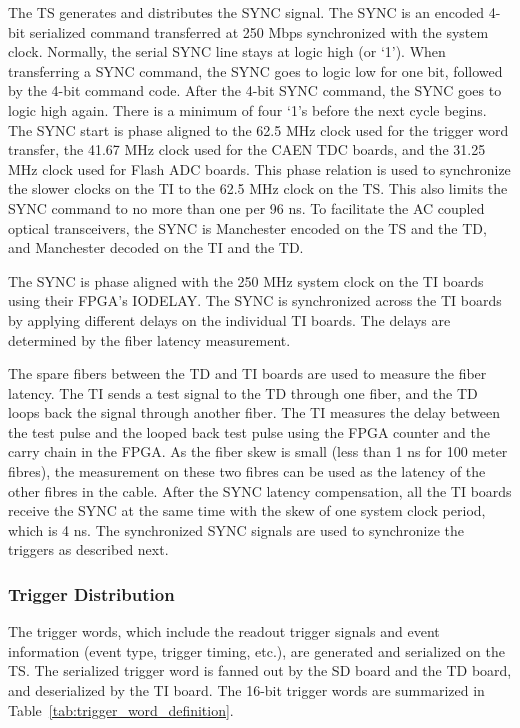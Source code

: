 The TS generates and distributes the SYNC signal.  The SYNC is an encoded 4-bit serialized command transferred at 250 Mbps synchronized with the system clock.  Normally, the serial SYNC line stays at logic high (or ‘1’).  When transferring a SYNC command, the SYNC goes to logic low for one bit, followed by the 4-bit command code.  After the 4-bit SYNC command, the SYNC goes to logic high again.  There is a minimum of four ‘1’s before the next cycle begins.  The SYNC start is phase aligned to the 62.5 MHz clock used for the trigger word transfer, the 41.67 MHz clock used for the CAEN TDC boards, and the 31.25 MHz clock used for Flash ADC boards.  This phase relation is used to synchronize the slower clocks on the TI to the 62.5 MHz clock on the TS.  This also limits the SYNC command to no more than one per 96 ns.  To facilitate the AC coupled optical transceivers, the SYNC is Manchester encoded on the TS and the TD, and Manchester decoded on the TI and the TD.

The SYNC is phase aligned with the 250 MHz system clock on the TI boards using their FPGA’s IODELAY.  The SYNC is synchronized across the TI boards by applying different delays on the individual TI boards.  The delays are determined by the fiber latency measurement.  

The spare fibers between the TD and TI boards are used to measure the fiber latency.  The TI sends a test signal to the TD through one fiber, and the TD loops back the signal through another fiber.  The TI measures the delay between the test pulse and the looped back test pulse using the FPGA counter and the carry chain in the FPGA.  As the fiber skew is small (less than 1 ns for 100 meter fibres), the measurement on these two fibres can be used as the latency of the other fibres in the cable.  
After the SYNC latency compensation, all the TI boards receive the SYNC at the same time with the skew of one system clock period, which is 4 ns.  The synchronized SYNC signals are used to synchronize the triggers as described next.


\subsubsection{Trigger Distribution}

The trigger words, which include the readout trigger signals and event information (event type, trigger timing, etc.), are generated and serialized on the TS.  The serialized trigger word is fanned out by the SD board and the TD board, and deserialized by the TI board.  The 16-bit trigger words are summarized in Table~\ref{tab:trigger_word_definition}.  

